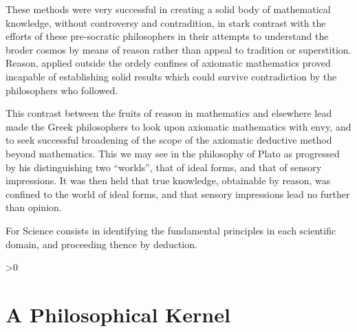 \documentclass[10pt,titlepage]{book}
\newcommand{\ignore}[1]{}
\newcommand{\resetnotes}{%
  \ifnum\value{endnote}>0%
  \theendnotes%
  \setcounter{endnote}{0}%
  \else%
  \fi%
}
\begin{document}
These methods were very successful in creating a solid body of mathematical knowledge, without controversy and contradition, in stark contrast with the efforts of these pre-socratic philosophers in their attempts to understand the broder cosmos by means of reason rather than appeal to tradition or superstition.
Reason, applied outside the ordely confines of axiomatic mathematics proved incapable of establishing solid results which could survive contradiction by the philosophers who followed.

This contrast between the fruits of reason in mathematics and elsewhere lead made the Greek philosophers to look upon axiomatic mathematics with envy, and to seek successful broadening of the scope of the axiomatic deductive method beyond mathematics.
This we may see in the philosophy of Plato as progressed by his distinguishing two ``worlds'', that of ideal forms, and that of sensory impressions.
It was then held that true knowledge, obtainable by reason, was confined to the world of ideal forms, and that sensory impressions lead no further than opinion.

For Science consists in identifying the fundamental principles in each scientific domain, and proceeding thence by deduction.


\ignore{
The epicenter of this monograph is a conception of finitary declarative language and a relationship of semantic reducibility among these languages, which holds when one language can be translated into another by a computable mapping which preserves abstract semantics.
In the context of these ideas certain 
Because of these characteristics, the general problem of defining the semantics of declarative languages and resoning from knowledge represented in them can be addressed through such reductions.

These quasi-universal declarative languages are candidate representatons for large scale repositories of knowledge.
They are also serve to

\cite{couturat1901logique}

among which certain languages are found to be universal' in the sense that any other language
``quasi-universal'' abstract representation for declarative language and logical truth, with a sound and 'practically complete' formal deductive system.
To this abstract language all other declarative language is reducible

}%

\resetnotes

\chapter{A Philosophical Kernel}\label{PK}
\end{document}
